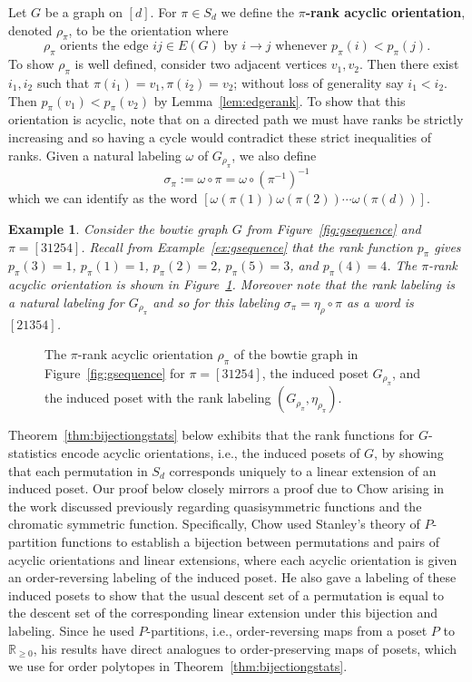 \documentclass[11pt]{amsart}
\newtheorem{exam}{Example}
\newenvironment{example}{\begin{exam}\sf}{\end{exam}}
\newcommand\Def[1]{{\bf #1}}
\newcommand{\rk}[1][\pi]{p_{#1}}
\begin{document}
Let $G$ be a graph on $[d]$. 
For $\pi \in S_d$ we define the \Def{$\pi$-rank acyclic orientation}, denoted $\rho_\pi$, to be the orientation where 
\[
    \rho_\pi \text{ orients the edge } ij \in E(G) \text{ by } i \to j \text{ whenever } \rk(i) < \rk(j).
\]
To show $\rho_\pi$ is well defined, consider two adjacent vertices $v_1,v_2$. 
Then there exist $i_1,i_2$ such that $\pi(i_1) = v_1, \pi(i_2) = v_2$; without loss of generality say $i_1 < i_2$. 
Then $\rk(v_1) < \rk(v_2)$ by Lemma~\ref{lem:edgerank}.
To show that this orientation is acyclic, note that on a directed path we must have ranks be strictly increasing and so having a cycle would contradict these strict inequalities of ranks.
Given a natural labeling $\omega$ of $G_{\rho_\pi}$, we also define 
\[
    \sigma_\pi := \omega \circ \pi = \omega \circ (\pi^{-1})^{-1}
\]
which we can identify as the word $[\omega(\pi(1)) \omega(\pi(2)) \cdots \omega(\pi(d))]$.

\begin{example}
    Consider the bowtie graph $G$ from Figure~\ref{fig:gsequence} and $\pi = [31254]$. Recall from Example~\ref{ex:gsequence} that the rank function $\rk$ gives $\rk(3) = 1$, $\rk(1)=1$, $\rk(2)=2$, $\rk(5)=3$, and $\rk(4)=4$. The $\pi$-rank acyclic orientation is shown in Figure~\ref{fig:pirankposet}. Moreover note that the rank labeling is a natural labeling for $G_{\rho_\pi}$ and so for this labeling $\sigma_\pi = \eta_\rho \circ \pi$ as a word is $[21354]$.
\end{example}

\begin{figure}
    \centering
    
    \caption{The $\pi$-rank acyclic orientation $\rho_\pi$ of the bowtie graph in Figure~\ref{fig:gsequence} for $\pi=[31254]$, the induced poset $G_{\rho_\pi}$, and the induced poset with the rank labeling $(G_{\rho_\pi},\eta_{\rho_\pi})$.}
    \label{fig:pirankposet}
\end{figure}

Theorem~\ref{thm:bijectiongstats} below exhibits that the rank functions for $G$-statistics encode acyclic orientations, i.e., the induced posets of $G$, by showing that each permutation in $S_d$ corresponds uniquely to a linear extension of an induced poset.
Our proof below closely mirrors a proof due to Chow \cite{chow1999} arising in the work discussed previously regarding quasisymmetric functions and the chromatic symmetric function.
Specifically, Chow used Stanley's \cite{stanleychromatic} theory of $P$-partition functions to establish a bijection between permutations and pairs of acyclic orientations and linear extensions, where each acyclic orientation is given an order-reversing labeling of the induced poset.
He also gave a labeling of these induced posets to show that the usual descent set of a permutation is equal to the descent set of the corresponding linear extension under this bijection and labeling.
Since he used $P$-partitions, i.e., order-reversing maps from a poset $P$ to $\mathbb{R}_{\geq 0}$, his results
have direct analogues to order-preserving maps of posets, which we use for order polytopes in Theorem~\ref{thm:bijectiongstats}. 
\end{document}
